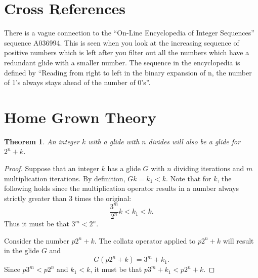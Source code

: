 \documentclass{article}
\newtheorem{theorem}{Theorem}
\begin{document}
\section{Cross References}
There is a vague connection to the ``On-Line Encyclopedia of Integer Sequences'' sequence A036994.  This is seen when you look at the 
increasing sequence of positive numbers which is left after you filter out all the numbers which have a redundant glide 
with a smaller number.  The sequence in the encyclopedia is defined by ``Reading from right to left in the binary expansion of n, 
the number of 1's always stays ahead of the number of 0's''.

\section{Home Grown Theory}

\begin{theorem}
An integer $k$ with a glide with $n$ divides will also be a glide for $2^n+k$.
\end{theorem}

\begin{proof}
Suppose that an integer $k$ has a glide $G$ with $n$ dividing iterations and $m$ multiplication iterations.  By definition, 
$Gk=k_1<k$.  
Note that for $k$, the following holds since the multiplication operator results in a number always strictly greater 
than $3$ times the original:
\[
\frac{3^m}{2^n}k<k_1<k\textrm{.}
\]
Thus it must be that $3^m<2^n$.

Consider the number $p 2^n+k$.  The collatz operator applied to $p 2^n+k$ will result in the glide $G$ and 
\[
G(p2^n+k)=3^m+k_1\mbox{.}
\]
Since $p 3^m<p 2^n$ and $k_1<k$, it must be that $p 3^m+k_1<p 2^n+k$.
\end{proof}
\end{document}
